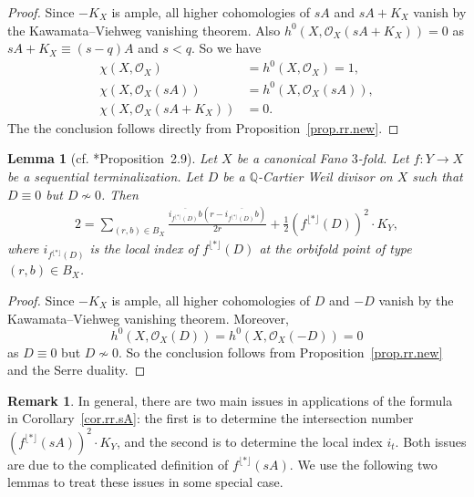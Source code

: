 \documentclass[12pt,twoside]{amsart}
\newtheorem{lem}[thm]{Lemma}
\theoremstyle{definition}
\newtheorem{rem}[thm]{Remark}
\begin{document}
\begin{proof}
    Since $-K_X$ is ample, all higher cohomologies of $sA$ and $sA+K_X$ vanish 
    by the Kawamata--Viehweg vanishing theorem. Also $h^0(X, \mathcal{O}_X(sA+K_X))=0$ as $sA+K_X\equiv (s-q)A$ and $s<q$. So we have 
    \begin{align*}
        \chi(X, \mathcal{O}_X){}&=h^0(X, \mathcal{O}_X)=1,\\
        \chi(X, \mathcal{O}_X(sA)){}&=h^0(X, \mathcal{O}_X(sA)),\\
        \chi(X, \mathcal{O}_X(sA+K_X)){}&=0.
    \end{align*}
    The the conclusion follows directly from Proposition~\ref{prop.rr.new}.
\end{proof}

\begin{lem}[{cf. \cite{prokhorov2010}*{Proposition~2.9}}]\label{lem.torsionRR}
    Let $X$ be a canonical Fano $3$-fold. Let $f\colon Y\to X$ be a sequential terminalization. Let $D$ be a $\mathbb{Q}$-Cartier Weil divisor on $X$ such that $D\equiv 0$ but $D\not\sim 0$. Then
    \begin{align*}
        2=\sum_{(r,b)\in B_X}\frac{\overline{ i_{f^{\lfloor *\rfloor}(D)} b}(r-\overline{i_{f^{\lfloor *\rfloor}(D)}b})}{2r}+\frac{1}{2}(f^{\lfloor *\rfloor}(D))^2\cdot K_Y,
    \end{align*}
    where $i_{f^{\lfloor *\rfloor}(D)} $ is the local index of ${f^{\lfloor *\rfloor}(D)}$ at the orbifold point of type $(r,b)\in B_X$.
\end{lem}

\begin{proof}
    Since $-K_X$ is ample, all higher cohomologies of $ D$ and $-D$ vanish 
    by the Kawamata--Viehweg vanishing theorem. Moreover, 
    \[
        h^0(X, \mathcal{O}_X(D))=h^0(X, \mathcal{O}_X(-D))=0
    \]
    as $D\equiv 0$ but $D\not\sim 0$. So the conclusion follows from Proposition~\ref{prop.rr.new} and the Serre duality. 
\end{proof}


\begin{rem}
    In general, there are two main issues in applications of the formula in Corollary~\ref{cor.rr.sA}: the first is to determine the intersection number $(f^{\lfloor *\rfloor}(sA))^2\cdot K_Y$, and the second is to determine the local index $i_t$. Both issues are due to the complicated definition of $f^{\lfloor *\rfloor}(sA)$. We use the following two lemmas to treat these issues in some special case.
\end{rem}
\end{document}
